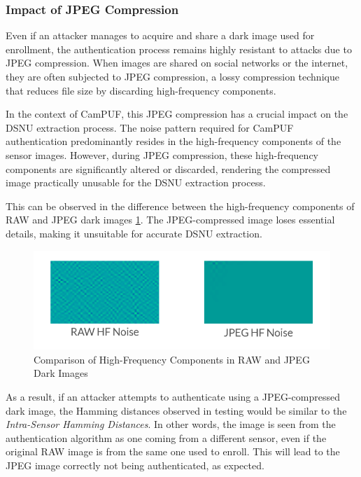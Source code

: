 \subsubsection{Impact of JPEG Compression}

Even if an attacker manages to acquire and share a dark image used for enrollment, the authentication process remains highly resistant to attacks due to JPEG compression. When images are shared on social networks or the internet, they are often subjected to JPEG compression, a lossy compression technique that reduces file size by discarding high-frequency components.

In the context of CamPUF, this JPEG compression has a crucial impact on the DSNU extraction process. The noise pattern required for CamPUF authentication predominantly resides in the high-frequency components of the sensor images. However, during JPEG compression, these high-frequency components are significantly altered or discarded, rendering the compressed image practically unusable for the DSNU extraction process.

This can be observed in the difference between the high-frequency components of RAW and JPEG dark images \ref{fig:jpeg_comp}. The JPEG-compressed image loses essential details, making it unsuitable for accurate DSNU extraction.

\begin{figure}[h!]
	\centering
	\vspace{0.5cm}
	\includegraphics{images/jpeg_vs_raw_HF.png}
	\caption{Comparison of High-Frequency Components in RAW and JPEG Dark Images}
	\label{fig:jpeg_comp}
\end{figure}

As a result, if an attacker attempts to authenticate using a JPEG-compressed dark image, the Hamming distances observed in testing would be similar to the \emph{Intra-Sensor Hamming Distances}. In other words, the image is seen from the authentication algorithm as one coming from a different sensor, even if the original RAW image is from the same one used to enroll. This will lead to the JPEG image correctly not being authenticated, as expected.

